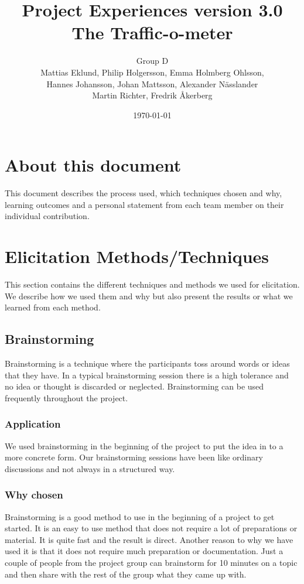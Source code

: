 \documentclass[a4paper]{article}
\title{Project Experiences version 3.0 \\ The Traffic-o-meter}
\author{Group D\\ Mattias Eklund, Philip Holgersson, Emma Holmberg Ohlsson,\\ Hannes Johansson, Johan Mattsson, Alexander Nässlander\\Martin Richter, Fredrik Åkerberg}
\date{\today}
\begin{document}
	\maketitle
	\thispagestyle{empty}
	\setcounter{page}{0}
	\pagebreak
	\tableofcontents
	\pagebreak
	
	\section{About this document}
	This document describes the process used, which techniques chosen and why, learning outcomes and a personal statement from each team member on their individual contribution.
	\section{Elicitation Methods/Techniques}
This section contains the different techniques and methods we used for elicitation. We describe how we used them and why but also present the results or what we learned from each method.
	\subsection{Brainstorming}
Brainstorming is a technique where the participants toss around words or ideas that they have. In a typical brainstorming session there is a high tolerance and no idea or thought is discarded or neglected. Brainstorming can be used frequently throughout the project.
		\subsubsection{Application}
We used brainstorming in the beginning of the project to put the idea in to a more concrete form. Our brainstorming sessions have been like ordinary discussions and not always in a structured way.
		\subsubsection{Why chosen}
Brainstorming is a good method to use in the beginning of a project to get started. It is an easy to use method that does not require a lot of preparations or material. It is quite fast and the result is direct. Another reason to why we have used it is that it does not require much preparation or documentation. Just a couple of people from the project group can brainstorm for 10 minutes on a topic and then share with the rest of the group what they came up with.
\end{document}
